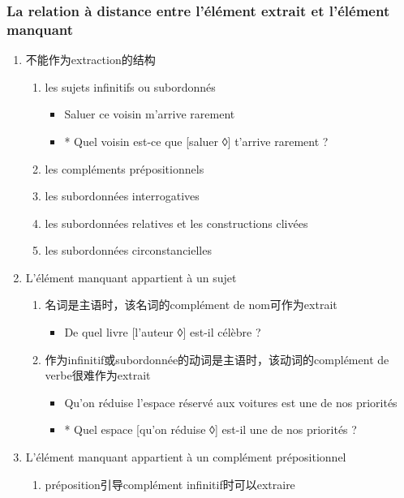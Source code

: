 \documentclass[UTF8]{report}
\begin{document}
\subsubsection{La relation à distance entre l’élément extrait et l’élément manquant}
\begin{enumerate}
    \item 不能作为extraction的结构
    \begin{enumerate}
        \item les sujets infinitifs ou subordonnés
        \begin{itemize}
            \item Saluer ce voisin m’arrive rarement
            \item  * Quel voisin est-ce que [saluer ◊] t’arrive rarement ?
        \end{itemize}
        \item les compléments prépositionnels
        \item les subordonnées interrogatives
        \item les subordonnées relatives et les constructions clivées
        \item les subordonnées circonstancielles
    \end{enumerate}
    \item L’élément manquant appartient à un sujet
    \begin{enumerate}
        \item 名词是主语时，该名词的complément de nom可作为extrait
        \begin{itemize}
            \item  De quel livre [l’auteur ◊] est-il célèbre ?
        \end{itemize}
        \item 作为infinitif或subordonnée的动词是主语时，该动词的complément de verbe很难作为extrait
        \begin{itemize}
            \item Qu’on réduise l’espace réservé aux voitures est une de nos priorités
            \item * Quel espace [qu’on réduise ◊] est-il une de nos priorités ?
        \end{itemize}
    \end{enumerate}
    \item L’élément manquant appartient à un complément prépositionnel
    \begin{enumerate}
        \item préposition引导complément infinitif时可以extraire

\end{enumerate}
\end{enumerate}
\end{document}
